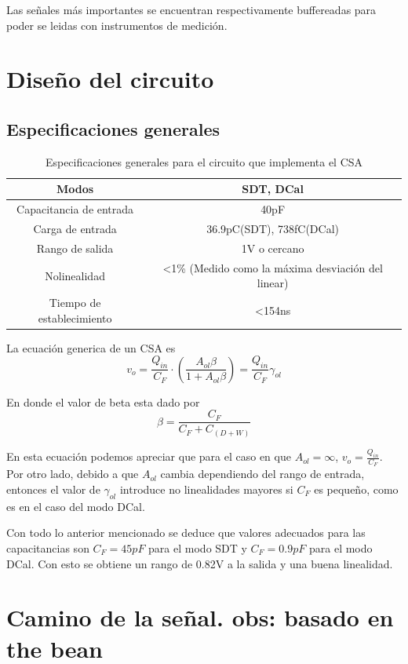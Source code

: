 Las señales más importantes se encuentran respectivamente buffereadas para poder se leidas con instrumentos de medición. 
\section{Diseño del circuito}
\subsection{Especificaciones generales}
\begin{table}
\begin{tabular}{|c|c|}
\hline 
Modos & SDT, DCal \\ 
\hline 
Capacitancia de entrada & 40pF \\ 
\hline 
Carga de entrada & 36.9pC(SDT), 738fC(DCal) \\ 
\hline 
Rango de salida & 1V o cercano \\ 
\hline 
Nolinealidad & <1\% (Medido como la máxima desviación del linear)\\ 
\hline 
Tiempo de establecimiento & <154ns \\ 
\hline 
\end{tabular} 
\caption{Especificaciones generales para el circuito que implementa el CSA}
\end{table}

La ecuación generica de un CSA es
\begin{equation}
v_o=\frac{Q_{in}}{C_F}\cdot (\frac{A_{ol}\beta}{1+A_{ol}\beta})=\frac{Q_{in}}{C_F}\gamma_{ol}
\end{equation}

En donde el valor de beta esta dado por
\begin{equation}
\beta=\frac{C_F}{C_F+ C_{(D+W)}}
\end{equation}

En esta ecuación podemos apreciar que para el caso en que $A_{ol}= \infty$, $v_o=\frac{Q_{in}}{C_F}$.
Por otro lado, debido a que $A_{ol}$ cambia dependiendo del rango de entrada, entonces el valor de $\gamma_{ol}$ introduce no linealidades mayores si $C_F$ es pequeño, como es en el caso del modo DCal.

Con todo lo anterior mencionado se deduce que valores adecuados para las capacitancias son  $C_F=45pF$ para el modo SDT y $C_F=0.9pF$ para el modo DCal. Con esto se obtiene un rango de 0.82V a la salida y una buena linealidad.

\section{Camino de la señal. obs: basado en the bean}

